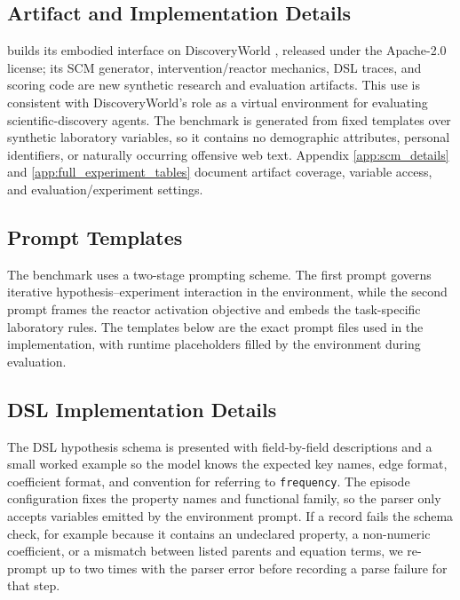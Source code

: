 \subsection{Artifact and Implementation Details}
\label{app:artifact_implementation}

\projectname{} builds its embodied interface on DiscoveryWorld
\citep{DBLP:journals/corr/abs-2406-06769}, released under the Apache-2.0
license; its SCM generator, intervention/reactor mechanics, DSL traces, and
scoring code are new synthetic research and evaluation artifacts. This use is
consistent with DiscoveryWorld's role as a virtual environment for evaluating
scientific-discovery agents. The benchmark is generated from fixed templates
over synthetic laboratory variables, so it contains no demographic attributes,
personal identifiers, or naturally occurring offensive web text. Appendix
\ref{app:scm_details} and \ref{app:full_experiment_tables} document artifact
coverage, variable access, and evaluation/experiment settings.

\subsection{Prompt Templates}

The benchmark uses a two-stage prompting scheme. The first prompt governs
iterative hypothesis--experiment interaction in the environment, while the
second prompt frames the reactor activation objective and embeds the
task-specific laboratory rules. The templates below are the exact prompt files
used in the implementation, with runtime placeholders filled by the environment
during evaluation.





\subsection{DSL Implementation Details}
\label{app:dsl_implementation}

The DSL hypothesis schema is presented with field-by-field descriptions and a
small worked example so the model knows the expected key names, edge format,
coefficient format, and convention for referring to \texttt{frequency}. The
episode configuration fixes the property names and functional family, so the
parser only accepts variables emitted by the environment prompt. If a record
fails the schema check, for example because it contains an undeclared property,
a non-numeric coefficient, or a mismatch between listed parents and equation
terms, we re-prompt up to two times with the parser error before recording a
parse failure for that step.

